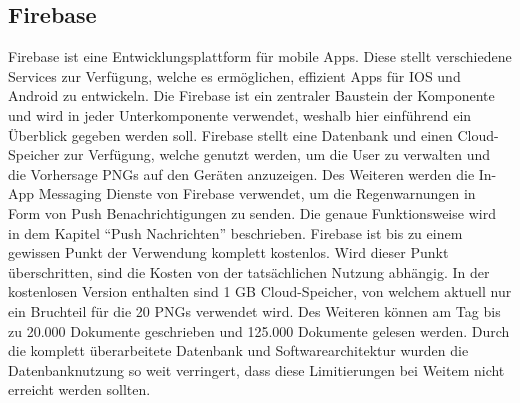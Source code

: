 \subsection{Firebase}\label{firebase}
Firebase ist eine Entwicklungsplattform für mobile Apps. 
Diese stellt verschiedene Services zur Verfügung, welche es ermöglichen, effizient Apps für IOS und Android zu entwickeln. 
Die Firebase ist ein zentraler Baustein der Komponente und wird in jeder Unterkomponente verwendet, weshalb hier einführend 
ein Überblick gegeben werden soll. 
Firebase stellt eine Datenbank und einen Cloud-Speicher zur Verfügung, welche genutzt werden, um die User zu verwalten und die 
Vorhersage PNGs auf den Geräten anzuzeigen.
Des Weiteren werden die In-App Messaging Dienste von Firebase verwendet, um die Regenwarnungen in Form von Push Benachrichtigungen zu senden. 
Die genaue Funktionsweise wird in dem Kapitel “Push Nachrichten” beschrieben.   
Firebase ist bis zu einem gewissen Punkt der Verwendung komplett kostenlos. 
Wird dieser Punkt überschritten, sind die Kosten von der tatsächlichen Nutzung abhängig. 
In der kostenlosen Version enthalten sind 1 GB Cloud-Speicher, von welchem aktuell nur ein Bruchteil für die 20 PNGs 
verwendet wird. Des Weiteren können am Tag bis zu 20.000 Dokumente geschrieben und 125.000 Dokumente gelesen werden. 
Durch die komplett überarbeitete Datenbank und Softwarearchitektur wurden die Datenbanknutzung so weit verringert, 
dass diese Limitierungen bei Weitem nicht erreicht werden sollten.